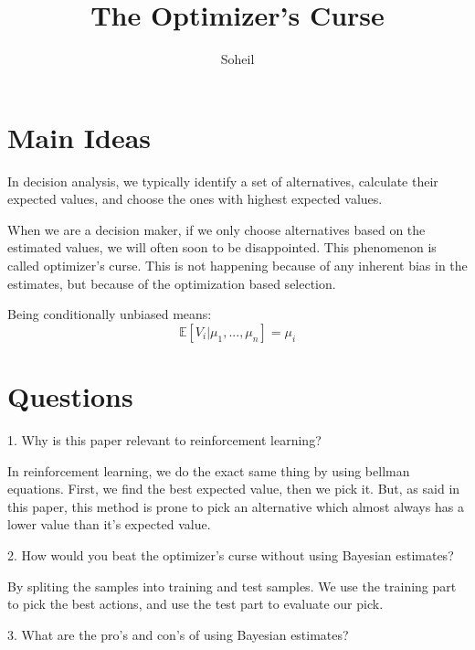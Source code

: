 \documentclass{article}
\title{The Optimizer's Curse}
\author{Soheil}
\date{}
\theoremstyle{remark}
\theoremstyle{remark}
\theoremstyle{remark}
\theoremstyle{remark}
\theoremstyle{remark}
\theoremstyle{remark}
\begin{document}
\maketitle
\section{Main Ideas}
In decision analysis, we typically identify a set of alternatives, calculate their expected values, and choose the ones with highest expected values.

When we are a decision maker, if we only choose alternatives based on the estimated values, we will often soon to be disappointed. This phenomenon is called optimizer's curse. This is not happening because of any inherent bias in the estimates, but because of the optimization based selection.


Being conditionally unbiased means:
$$ \mathbb{E}[V_i | \mu_1, ..., \mu_n ] = \mu_i $$

\section{Questions}

1. Why is this paper relevant to reinforcement learning?

In reinforcement learning, we do the exact same thing by using bellman equations. First, we find the best expected value, then we pick it. But, as said in this paper, this method is prone to pick an alternative which almost always has a lower value than it's expected value.

2. How would you beat the optimizer's curse without using Bayesian estimates?

By spliting the samples into training and test samples. We use the training part to pick the best actions, and use the test part to evaluate our pick.


3. What are the pro's and con's of using Bayesian estimates?
\end{document}
